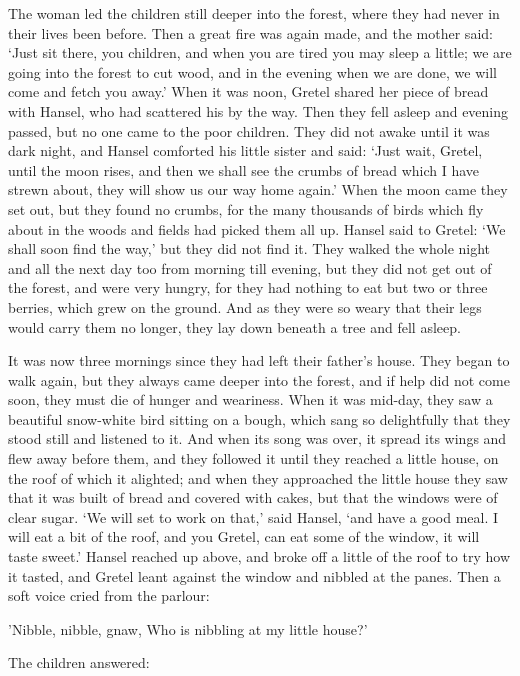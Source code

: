 The woman led the children still deeper into the forest, where they had never in their lives been before. Then a great fire was again made, and the mother said: `Just sit there, you children, and when you are tired you may sleep a little; we are going into the forest to cut wood, and in the evening when we are done, we will come and fetch you away.' When it was noon, Gretel shared her piece of bread with Hansel, who had scattered his by the way. Then they fell asleep and evening passed, but no one came to the poor children. They did not awake until it was dark night, and Hansel comforted his little sister and said: `Just wait, Gretel, until the moon rises, and then we shall see the crumbs of bread which I have strewn about, they will show us our way home again.' When the moon came they set out, but they found no crumbs, for the many thousands of birds which fly about in the woods and fields had picked them all up. Hansel said to Gretel: `We shall soon find the way,' but they did not find it. They walked the whole night and all the next day too from morning till evening, but they did not get out of the forest, and were very hungry, for they had nothing to eat but two or three berries, which grew on the ground. And as they were so weary that their legs would carry them no longer, they lay down beneath a tree and fell asleep.

It was now three mornings since they had left their father's house. They began to walk again, but they always came deeper into the forest, and if help did not come soon, they must die of hunger and weariness. When it was mid-day, they saw a beautiful snow-white bird sitting on a bough, which sang so delightfully that they stood still and listened to it. And when its song was over, it spread its wings and flew away before them, and they followed it until they reached a little house, on the roof of
which it alighted; and when they approached the little house they saw that it was built of bread and covered with cakes, but that the windows were of clear sugar. `We will set to work on that,' said Hansel, `and have a good meal. I will eat a bit of the roof, and you Gretel, can eat some of the window, it will taste sweet.' Hansel reached up above, and broke off a little of the roof to try how it tasted, and Gretel leant against the window and nibbled at the panes. Then a soft voice cried
from the parlour:

'Nibble, nibble, gnaw,
Who is nibbling at my little house?'

The children answered:

